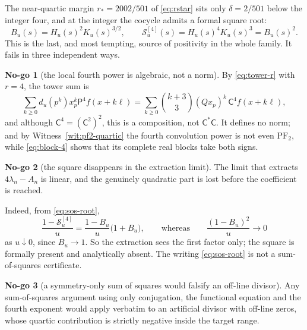 \documentclass[11pt]{amsart}
\theoremstyle{definition}
\theoremstyle{remark}
\theoremstyle{definition}
\newtheorem{nogo}{No-go}[section]
\newcommand{\Pp}{\mathsf{P}}
\newcommand{\Cc}{\mathsf{C}}
\begin{document}
The near-quartic margin $r_*=2002/501$ of \eqref{eq:rstar} sits only $\delta=2/501$ below the
integer four, and at the integer the cocycle admits a formal square root:
\begin{equation}\label{eq:sos-root}
   B_u(s)=H_u(s)^2K_u(s)^{3/2},
   \qquad
   \mathcal S_u^{[4]}(s)=H_u(s)^4K_u(s)^3=B_u(s)^2 .
\end{equation}
This is the last, and most tempting, source of positivity in the whole family. It fails in three
independent ways.

\begin{nogo}[the local fourth power is algebraic, not a norm]\label{ng:sos-local}
By \eqref{eq:tower-r} with $r=4$, the tower sum is
\begin{equation}\label{eq:sos-tower}
   \sum_{k\ge0}d_u(p^k)x_p^k\Pp^4f(x+k\ell)
   =\sum_{k\ge0}\binom{k+3}{3}(Qx_p)^k\,\Cc^4f(x+k\ell),
\end{equation}
and although $\Cc^4=(\Cc^2)^2$, this is a composition, not $\Cc^{*}\Cc$. It defines no norm; and by
Witness~\ref{wit:pf2-quartic} the fourth convolution power is not even $\mathrm{PF}_2$, while
\eqref{eq:block-4} shows that its complete real blocks take both signs.
\end{nogo}

\begin{nogo}[the square disappears in the extraction limit]\label{ng:sos-limit}
The limit that extracts $4\lambda_n-A_n$ is linear, and the genuinely quadratic part is lost before
the coefficient is reached.
\end{nogo}

\noindent Indeed, from \eqref{eq:sos-root},
\begin{equation}\label{eq:sos-lin}
   \frac{1-\mathcal S_u^{[4]}}{u}=\frac{1-B_u}{u}\bigl(1+B_u\bigr),
   \qquad\text{whereas}\qquad
   \frac{(1-B_u)^2}{u}\longrightarrow0
\end{equation}
as $u\downarrow0$, since $B_u\to1$. So the extraction sees the first factor only; the square is
formally present and analytically absent. The writing \eqref{eq:sos-root} is not a sum-of-squares
certificate.

\begin{nogo}[a symmetry-only sum of squares would falsify an off-line divisor]\label{ng:sos-offline}
Any sum-of-squares argument using only conjugation, the functional equation and the fourth exponent
would apply verbatim to an artificial divisor with off-line zeros, whose quartic contribution is
strictly negative inside the target range.
\end{nogo}
\end{document}
